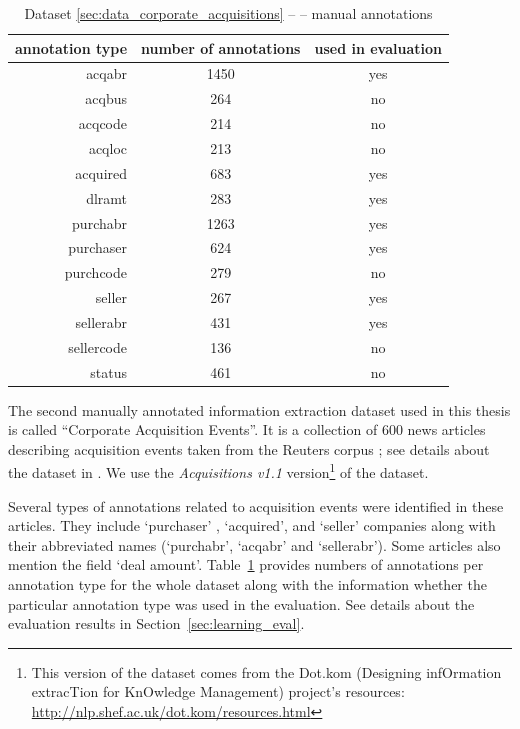 \begin{table}
\centering
\begin{tabular}{|r||c|c|}
\hline
\textbf{annotation type} & \textbf{number of annotations} & \textbf{used in evaluation}\\
\hline
\hline
acqabr & 1450 & yes\\
\hline
acqbus & 264 & no\\
\hline
acqcode & 214 & no\\
\hline
acqloc & 213 & no\\
\hline
acquired & 683 & yes\\
\hline
dlramt & 283 & yes\\
\hline
purchabr & 1263 & yes\\
\hline
purchaser & 624 & yes\\
\hline
purchcode & 279 & no\\
\hline
seller & 267 & yes\\
\hline
sellerabr & 431 & yes\\
\hline
sellercode & 136 & no\\
\hline
status & 461 & no\\
\hline
\end{tabular}
\caption{Dataset \ref{sec:data_corporate_acquisitions} --  -- manual annotations} \label{tab:data_acquisitions}
\end{table}


The second manually annotated information extraction dataset used in this thesis is called ``Corporate Acquisition Events''. 
It is a collection of 600 news articles describing acquisition events taken from the Reuters corpus \citep{lewis1992representation}; see details about the dataset in \citep{Freitag:1999_phd}.
We use the \emph{Acquisitions v1.1} version\footnote{This version of the dataset comes from the Dot.kom (Designing infOrmation extracTion for KnOwledge Management) project's resources: \url{http://nlp.shef.ac.uk/dot.kom/resources.html}} of the dataset.

Several types of annotations related to acquisition events were identified in these articles. They include `purchaser' , `acquired', and
`seller' companies along with their abbreviated names (`purchabr', `acqabr' and
`sellerabr'). Some articles also mention the field `deal amount'. 
Table~\ref{tab:data_acquisitions} provides numbers of annotations per annotation type for the whole dataset along with the information whether the particular annotation type was used in the evaluation. See details about the evaluation results in Section~\ref{sec:learning_eval}. 

